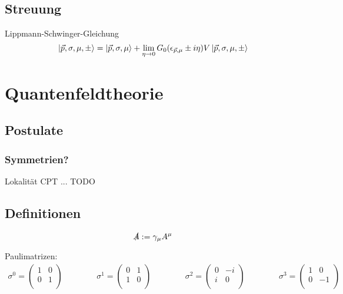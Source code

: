 \documentclass[11pt]{article}
\numberwithin{equation}{section}
\begin{document}
		\subsection{Streuung}
			\noindent
			Lippmann-Schwinger-Gleichung
			\begin{equation}
				\Ket{\vec{p},\sigma,\mu,\pm} = \Ket{\vec{p}, \sigma, \mu} + \lim_{\eta\rightarrow 0} G_0(\epsilon_{\vec{p},\mu}\pm i\eta) V \Ket{\vec{p},\sigma,\mu,\pm}
			\end{equation}


	\newpage
	\section{Quantenfeldtheorie} %
		\subsection{Postulate}
			\subsubsection{Symmetrien?}
				Lokalität
				CPT
				...
				TODO
		\subsection{Definitionen}
			\begin{equation}
				\slashed{A} := \gamma_\mu A^\mu
			\end{equation}

			\noindent
			Paulimatrizen:
			\begin{equation}
				\begin{aligned}
					\sigma^0 = \left(\begin{matrix}
						1 & 0 \\
						0 & 1 \\
					\end{matrix}\right) &&\hspace{30pt}
					\sigma^1 = \left(\begin{matrix}
						0 & 1 \\
						1 & 0 \\
					\end{matrix}\right) &&\hspace{30pt}
					\sigma^2 = \left(\begin{matrix}
						0 & -i \\
							i & 0 \\
					\end{matrix}\right) &&\hspace{30pt}
					\sigma^3 = \left(\begin{matrix}
						1 & 0 \\
						0 & -1 \\
					\end{matrix}\right)
				\end{aligned}
			\end{equation}
\end{document}
